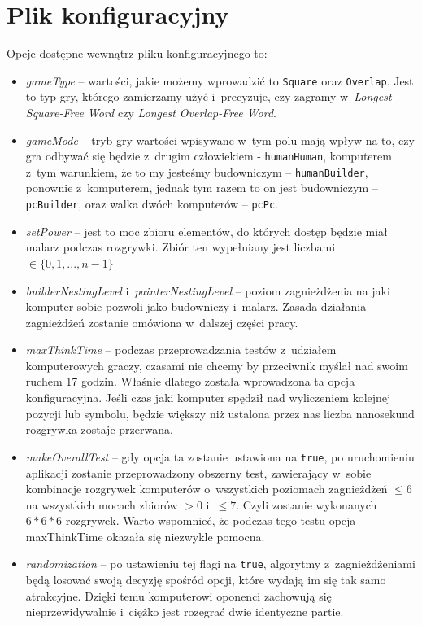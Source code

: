 \documentclass[document]{xmgr}
\begin{document}
\section{Plik konfiguracyjny}
Opcje dostępne wewnątrz pliku konfiguracyjnego to:
\begin{itemize}
\item \emph{gameType} -- wartości, jakie możemy wprowadzić to \texttt{Square} oraz \texttt{Overlap}. Jest to typ gry, którego zamierzamy użyć i~precyzuje, czy zagramy w~\emph{Longest Square-Free Word} czy \emph{Longest Overlap-Free Word}.
\item \emph{gameMode} -- tryb gry wartości wpisywane w~tym polu mają wpływ na to, czy gra odbywać się będzie z~drugim człowiekiem - \texttt{humanHuman}, komputerem z~tym warunkiem, że to my jesteśmy budowniczym -- \texttt{humanBuilder}, ponownie z~komputerem, jednak tym razem to on jest budowniczym -- \texttt{pcBuilder}, oraz walka dwóch komputerów -- \texttt{pcPc}.
\item \emph{setPower} -- jest to moc zbioru elementów, do których dostęp będzie miał malarz podczas rozgrywki. Zbiór ten wypełniany jest liczbami  $\in \{0, 1, ...,n-1\}$
\item \emph{builderNestingLevel} i~\emph{painterNestingLevel} -- poziom zagnieżdżenia na jaki komputer sobie pozwoli jako budowniczy i~malarz. Zasada działania zagnieżdżeń zostanie omówiona w~dalszej części pracy.
\item \emph{maxThinkTime} -- podczas przeprowadzania testów z~udziałem komputerowych graczy, czasami nie chcemy by przeciwnik myślał nad swoim ruchem 17 godzin. Właśnie dlatego została wprowadzona ta opcja konfiguracyjna. Jeśli czas jaki komputer spędził nad wyliczeniem kolejnej pozycji lub symbolu, będzie większy niż ustalona przez nas liczba nanosekund rozgrywka zostaje przerwana.
\item \emph{makeOverallTest} -- gdy opcja ta zostanie ustawiona na \texttt{true}, po uruchomieniu aplikacji zostanie przeprowadzony obszerny test, zawierający w~sobie kombinacje rozgrywek komputerów o~wszystkich poziomach zagnieżdżeń $\leq 6$ na wszystkich mocach zbiorów $>0 $ i~$\leq 7$. Czyli zostanie wykonanych $6*6*6$ rozgrywek. Warto wspomnieć, że podczas tego testu opcja maxThinkTime okazała się niezwykle pomocna.
\item \emph{randomization} -- po ustawieniu tej flagi na \texttt{true}, algorytmy z~zagnieżdżeniami będą losować swoją decyzję spośród opcji, które wydają im się tak samo atrakcyjne. Dzięki temu komputerowi oponenci zachowują się nieprzewidywalnie i~ciężko jest rozegrać dwie identyczne partie.
\end{itemize}
\end{document}
